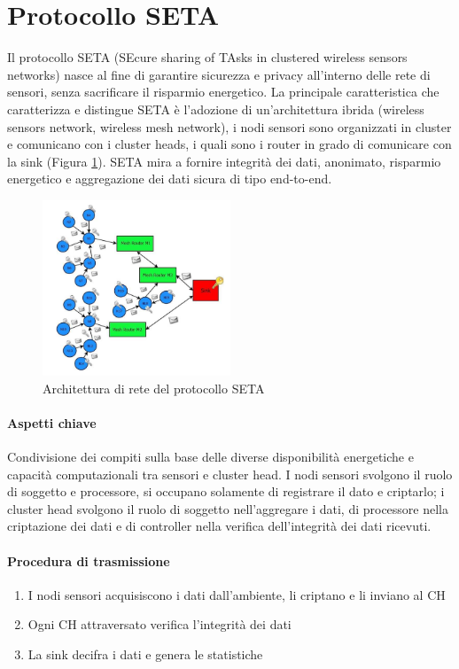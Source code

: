 \section{Protocollo SETA}

	Il protocollo SETA (SEcure sharing of TAsks in clustered wireless sensors networks) nasce al fine di garantire sicurezza e privacy all'interno delle rete di sensori, senza sacrificare il risparmio energetico.
	La principale caratteristica che caratterizza e distingue SETA è l'adozione di un'architettura ibrida (wireless sensors network, wireless mesh network), i nodi sensori sono organizzati in cluster e comunicano con i cluster heads, i quali sono i router in grado di comunicare con la sink (Figura \ref{fig:architetturaReteSETA}).
	SETA mira a fornire integrità dei dati, anonimato, risparmio energetico e aggregazione dei dati sicura di tipo end-to-end.
	
	\begin{figure}[h]
		\centering
		\includegraphics[width=0.5\textwidth]{lez6-SETA/SETA_NetworkModel.png}
		\caption{Architettura di rete del protocollo SETA}
		\label{fig:architetturaReteSETA}
	\end{figure}
	
\paragraph{Aspetti chiave}
	Condivisione dei compiti sulla base delle diverse disponibilità energetiche e capacità computazionali tra sensori e cluster head.
	I nodi sensori svolgono il ruolo di soggetto e processore, si occupano solamente di registrare il dato e criptarlo;
	i cluster head svolgono il ruolo di soggetto nell'aggregare i dati, di processore nella criptazione dei dati e di controller nella verifica dell'integrità dei dati ricevuti.
	
\paragraph{Procedura di trasmissione}
	\begin{enumerate}
		\item I nodi sensori acquisiscono i dati dall'ambiente, li criptano e li inviano al CH
		\item Ogni CH attraversato verifica l'integrità dei dati
		\item La sink decifra i dati e genera le statistiche
	\end{enumerate}

